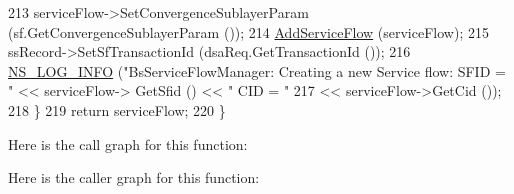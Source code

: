 \begin{DoxyCode}
213       serviceFlow->SetConvergenceSublayerParam (sf.GetConvergenceSublayerParam ());
214       \hyperlink{classns3_1_1BsServiceFlowManager_a9760cac0b022df419803d63dc9e84014}{AddServiceFlow} (serviceFlow);
215       ssRecord->SetSfTransactionId (dsaReq.GetTransactionId ());
216       \hyperlink{group__logging_gafbd73ee2cf9f26b319f49086d8e860fb}{NS\_LOG\_INFO} (\textcolor{stringliteral}{"BsServiceFlowManager: Creating a new Service flow: SFID = "} << serviceFlow->
      GetSfid () << \textcolor{stringliteral}{" CID = "}
217                                                                                 << serviceFlow->GetCid ());
218     \}
219   \textcolor{keywordflow}{return} serviceFlow;
220 \}
\end{DoxyCode}


Here is the call graph for this function\+:




Here is the caller graph for this function\+:


